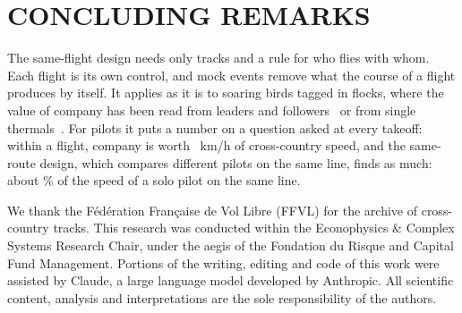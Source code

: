 \documentclass[aps,prl,twocolumn,superscriptaddress,nofootinbib]{revtex4-2}
\begin{document}
\section*{CONCLUDING REMARKS}

The same-flight design needs only tracks and a rule for who flies with whom. Each flight is its
own control, and mock events remove what the course of a flight produces by itself. It applies as
it is to soaring birds tagged in flocks, where the value of company has been read from leaders
and followers~\cite{Flack2018} or from single thermals~\cite{Williams2018,Sassi2024}. For pilots
it puts a number on a question asked at every takeoff: within a flight, company is worth
\LtFltMaxNetGXc{} \LtFltMaxNetGXcBand~km/h of cross-country speed, and the same-route design,
which compares different pilots on the same line, finds as much: about \LtRouteXcDiffPct\% of the
speed of a solo pilot on the same line.

\begin{acknowledgments}
We thank the F\'ed\'eration Fran\c{c}aise de Vol Libre (FFVL) for the archive of cross-country
tracks. This research was conducted within the Econophysics \& Complex Systems Research Chair,
under the aegis of the Fondation du Risque and Capital Fund Management. Portions of the writing,
editing and code of this work were assisted by Claude, a large language model developed by
Anthropic. All scientific content, analysis and interpretations are the sole responsibility of the
authors.
\end{acknowledgments}



\appendix


\end{document}
